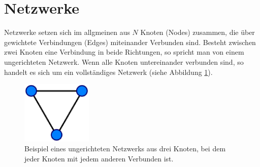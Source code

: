 
\section{Netzwerke}
Netzwerke setzen sich im allgmeinen aus $N$ Knoten (Nodes) zusammen, die über gewichtete Verbindungen (Edges) miteinander Verbunden sind. Besteht zwischen zwei Knoten eine Verbindung in beide Richtungen, so spricht man von einem ungerichteten Netzwerk. Wenn alle Knoten untereinander verbunden sind, so handelt es sich um ein vollständiges Netzwerk (siehe Abbildung \ref{fig:GraphBsp}).

\begin{figure}[t]
	 \centering
	\includegraphics[width=0.3\textwidth]{abb/misc/GraphBsp.eps}
	\caption[Ungerichteres Netzwerk]{Beispiel eines ungerichteten Netzwerks aus drei Knoten, bei dem jeder Knoten mit jedem anderen Verbunden ist.}
	\label{fig:GraphBsp}
\end{figure}


